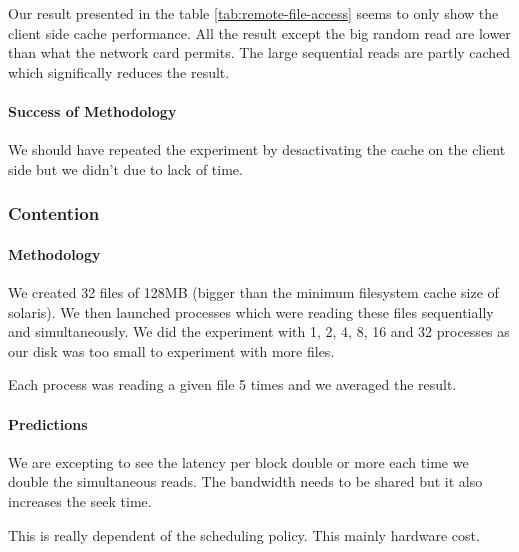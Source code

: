 Our result presented in the table \ref{tab:remote-file-access} seems to only
show the client side cache performance.
All the result except the big random read are lower than what the network card
permits.
The large sequential reads are partly cached which significally reduces the
result.

\paragraph{Success of Methodology}
We should have repeated the experiment by desactivating the cache on the client
side but we didn't due to lack of time.

\subsubsection{Contention}

\paragraph{Methodology}
We created 32 files of 128MB (bigger than the minimum filesystem cache size of
solaris).
We then launched processes which were reading these files sequentially and
simultaneously.
We did the experiment with 1, 2, 4, 8, 16 and 32 processes as our disk was too
small to experiment with more files.

Each process was reading a given file 5 times and we averaged the result.

\paragraph{Predictions}
We are excepting to see the latency per block double or more each time we double
the simultaneous reads.
The bandwidth needs to be shared but it also increases the seek time.

This is really dependent of the scheduling policy.
This mainly hardware cost.

